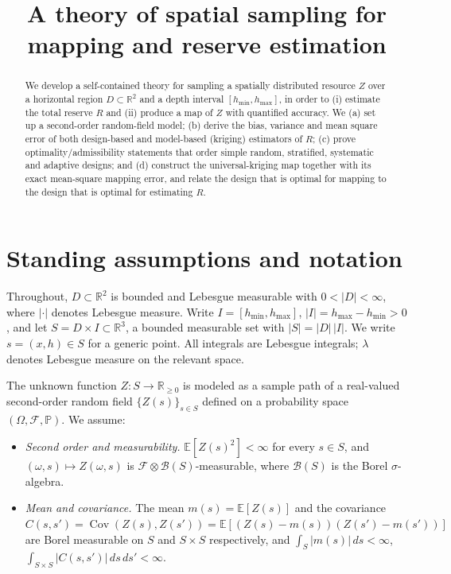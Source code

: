 \documentclass{amsart}
\theoremstyle{definition}
\newcommand{\R}{\mathbb{R}}
\newcommand{\E}{\mathbb{E}}
\newcommand{\Cov}{\operatorname{Cov}}
\newcommand{\Leb}{\lambda}
\begin{document}
\title{A theory of spatial sampling for mapping and reserve estimation}
\maketitle

\begin{abstract}
We develop a self-contained theory for sampling a spatially distributed
resource $Z$ over a horizontal region $D\subset\R^2$ and a depth interval
$[h_{\min},h_{\max}]$, in order to (i) estimate the total reserve $R$ and
(ii) produce a map of $Z$ with quantified accuracy. We (a) set up a
second-order random-field model; (b) derive the bias, variance and mean
square error of both design-based and model-based (kriging) estimators of
$R$; (c) prove optimality/admissibility statements that order simple
random, stratified, systematic and adaptive designs; and (d) construct the
universal-kriging map together with its exact mean-square mapping error,
and relate the design that is optimal for mapping to the design that is
optimal for estimating $R$.
\end{abstract}

\section{Standing assumptions and notation}\label{sec:setup}

Throughout, $D\subset\R^2$ is bounded and Lebesgue measurable with
$0<|D|<\infty$, where $|\cdot|$ denotes Lebesgue measure. Write
$I=[h_{\min},h_{\max}]$, $|I|=h_{\max}-h_{\min}>0$, and let
$S=D\times I\subset\R^3$, a bounded measurable set with
$|S|=|D|\,|I|$. We write $s=(x,h)\in S$ for a generic point. All integrals
are Lebesgue integrals; $\Leb$ denotes Lebesgue measure on the relevant
space.

The unknown function $Z:S\to\R_{\ge0}$ is modeled as a sample path of a
real-valued second-order random field $\{Z(s)\}_{s\in S}$ defined on a
probability space $(\Omega,\mathcal F,\mathbb P)$. We assume:

\begin{itemize}
\item[(A1)] \emph{Second order and measurability.} $\E[Z(s)^2]<\infty$
for every $s\in S$, and $(\omega,s)\mapsto Z(\omega,s)$ is
$\mathcal F\otimes\mathcal B(S)$-measurable, where $\mathcal B(S)$ is the
Borel $\sigma$-algebra.
\item[(A2)] \emph{Mean and covariance.} The mean
$m(s)=\E[Z(s)]$ and the covariance
$C(s,s')=\Cov(Z(s),Z(s'))=\E[(Z(s)-m(s))(Z(s')-m(s'))]$ are Borel
measurable on $S$ and $S\times S$ respectively, and
$\int_S |m(s)|\,ds<\infty$, $\int_{S\times S}|C(s,s')|\,ds\,ds'<\infty$.
\end{itemize}
\end{document}
